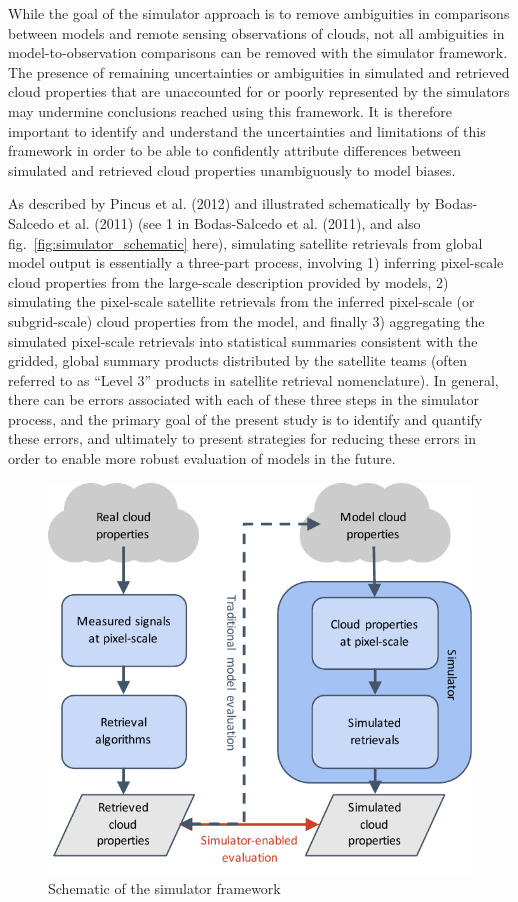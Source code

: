While the goal of the simulator approach is to remove ambiguities in
comparisons between models and remote sensing observations of clouds,
not all ambiguities in model-to-observation comparisons can be removed
with the simulator framework. The presence of remaining uncertainties or
ambiguities in simulated and retrieved cloud properties that are
unaccounted for or poorly represented by the simulators may undermine
conclusions reached using this framework. It is therefore important to
identify and understand the uncertainties and limitations of this
framework in order to be able to confidently attribute differences
between simulated and retrieved cloud properties unambiguously to model
biases.

As described by Pincus et al. (2012) and illustrated schematically by
Bodas-Salcedo et al. (2011) (see 1 in Bodas-Salcedo et al. (2011), and
also fig.~\ref{fig:simulator_schematic} here), simulating satellite
retrievals from global model output is essentially a three-part process,
involving 1) inferring pixel-scale cloud properties from the large-scale
description provided by models, 2) simulating the pixel-scale satellite
retrievals from the inferred pixel-scale (or subgrid-scale) cloud
properties from the model, and finally 3) aggregating the simulated
pixel-scale retrievals into statistical summaries consistent with the
gridded, global summary products distributed by the satellite teams
(often referred to as ``Level 3'' products in satellite retrieval
nomenclature). In general, there can be errors associated with each of
these three steps in the simulator process, and the primary goal of the
present study is to identify and quantify these errors, and ultimately
to present strategies for reducing these errors in order to enable more
robust evaluation of models in the future.

\begin{figure}[htbp]
\centering
\includegraphics{graphics/simulator_schematic.pdf}
\caption{\label{fig:simulator_schematic}Schematic of the simulator
framework}\label{fig:simulatorux5fschematic}
\end{figure}

